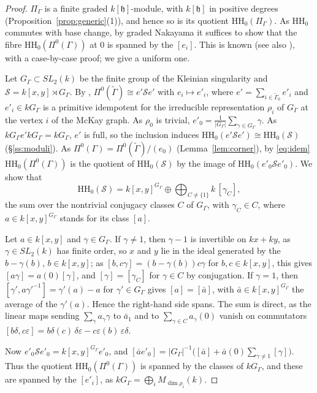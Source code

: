 \documentclass[11pt]{amsart}
\numberwithin{table}{section}
\numberwithin{figure}{section}
\numberwithin{equation}{section}
\theoremstyle{definition}
\theoremstyle{plain}
\newcommand{\h}{\mathfrak{h}}
\newcommand{\tGamma}{\widetilde{\Gamma}}
\newcommand{\HH}{\mathrm{HH}}
\begin{document}
\begin{proof}
$\Pi_\Gamma$ is a finite graded $k[\h]$-module, with $k[\h]$ in positive degrees (Proposition~\ref{prop:generic}(1)), and hence so is its quotient $\HH_0(\Pi_\Gamma)$. As $\HH_0$ commutes with base change, by graded Nakayama it suffices to show that the fibre $\HH_0(\Pi^0(\Gamma))$ at $0$ is spanned by the $[e_i]$. This is known \cite[Thm~1.4(a)]{MOV} (see also \cite[Thm~3.0.3]{EE}), with a case-by-case proof; we give a uniform one.

Let $G_\Gamma \subset SL_2(k)$ be the finite group of the Kleinian singularity and $\mathcal S = k[x, y] \rtimes G_\Gamma$. By \cite[Thm~3.4]{CBH}, $\Pi^0(\tGamma) \cong e'\mathcal Se'$ with $e_i \mapsto e'_i$, where $e' = \sum_{i \in \tGamma_0} e'_i$ and $e'_i \in kG_\Gamma$ is a primitive idempotent for the irreducible representation $\rho_i$ of $G_\Gamma$ at the vertex $i$ of the McKay graph. As $\rho_0$ is trivial, $e'_0 = \frac{1}{|G_\Gamma|}\sum_{\gamma \in G_\Gamma}\gamma$. As $kG_\Gamma e'kG_\Gamma = kG_\Gamma$, $e'$ is full, so the inclusion induces $\HH_0(e'\mathcal Se') \cong \HH_0(\mathcal S)$ (\S\ref{ss:moduli}). As $\Pi^0(\Gamma) = \Pi^0(\tGamma)/(e_0)$ (Lemma~\ref{lem:corner}), by \eqref{eq:idem} $\HH_0(\Pi^0(\Gamma))$ is the quotient of $\HH_0(\mathcal S)$ by the image of $\HH_0(e'_0\mathcal Se'_0)$. We show that
\[
\HH_0(\mathcal S) = k[x, y]^{G_\Gamma} \oplus \textstyle\bigoplus_{C \neq \{1\}} k\,[\gamma_C],
\]
the sum over the nontrivial conjugacy classes $C$ of $G_\Gamma$, with $\gamma_C \in C$, where $a \in k[x, y]^{G_\Gamma}$ stands for its class $[a]$.

Let $a \in k[x, y]$ and $\gamma \in G_\Gamma$. If $\gamma \neq 1$, then $\gamma - 1$ is invertible on $kx + ky$, as $\gamma \in SL_2(k)$ has finite order, so $x$ and $y$ lie in the ideal generated by the $b - \gamma(b)$, $b \in k[x, y]$; as $[b, c\gamma] = (b - \gamma(b))c\gamma$ for $b, c \in k[x, y]$, this gives $[a\gamma] = a(0)[\gamma]$, and $[\gamma] = [\gamma_C]$ for $\gamma \in C$ by conjugation. If $\gamma = 1$, then $[\gamma', a\gamma'^{-1}] = \gamma'(a) - a$ for $\gamma' \in G_\Gamma$ gives $[a] = [\bar a]$, with $\bar a \in k[x, y]^{G_\Gamma}$ the average of the $\gamma'(a)$. Hence the right-hand side spans. The sum is direct, as the linear maps sending $\sum_\gamma a_\gamma\gamma$ to $\bar a_1$ and to $\sum_{\gamma \in C} a_\gamma(0)$ vanish on commutators $[b\delta, c\varepsilon] = b\delta(c)\,\delta\varepsilon - c\varepsilon(b)\,\varepsilon\delta$.

Now $e'_0\mathcal Se'_0 = k[x, y]^{G_\Gamma}e'_0$, and $[\bar ae'_0] = |G_\Gamma|^{-1}\big([\bar a] + \bar a(0)\sum_{\gamma \neq 1}[\gamma]\big)$. Thus the quotient $\HH_0(\Pi^0(\Gamma))$ is spanned by the classes of $kG_\Gamma$, and these are spanned by the $[e'_i]$, as $kG_\Gamma = \bigoplus_i M_{\dim\rho_i}(k)$.
\end{proof}
\end{document}
